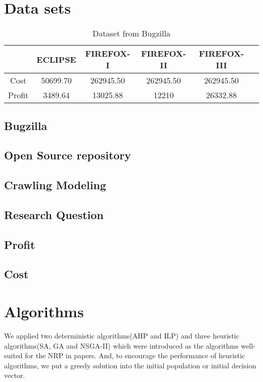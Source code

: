 \section{Data sets}


\begin{table} [H]
  \caption{Dataset from Bugzilla}
  \label{tab:commands}
  \begin{tabular}{cccccl}
    \toprule
    &ECLIPSE&FIREFOX-I&FIREFOX-II&FIREFOX-III\\
    \midrule
    Cost& 50699.70& 262945.50& 262945.50& 262945.50 \\
    Profit& 3489.64& 13025.88& 12210& 26332.88 \\
    \bottomrule
  \end{tabular}
\label{table:Dataset}
\end{table}

\subsection{Bugzilla}
\subsection{Open Source repository}
\subsection{Crawling Modeling}
\subsection{Research Question}
\subsection{Profit}
\subsection{Cost}

\section{Algorithms}
We applied two deterministic algorithms(AHP and ILP) and three heuristic algorithms(SA, GA and NSGA-II) which were introduced as the algorithms well-suited for the NRP in papers\cite{NRP}\cite{ILP}\cite{IGA}\cite{MONRP}. And, to encourage the performance of heuristic algorithms, we put a greedy solution into the initial population or initial decision vector.

